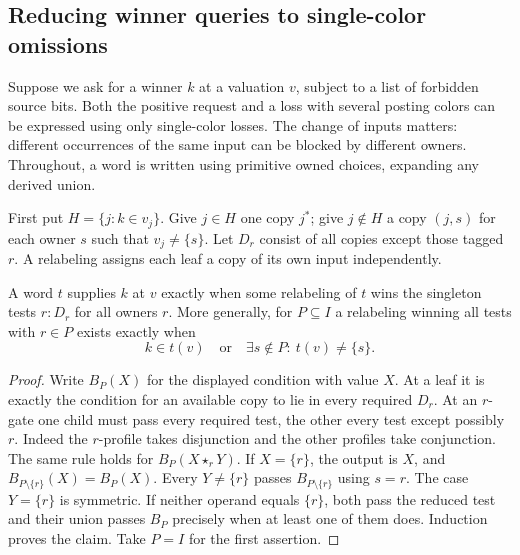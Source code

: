 \subsection{Reducing winner queries to single-color omissions}
\label{app:core-pure-interpolation}

Suppose we ask for a winner $k$ at a valuation $v$, subject to a list
of forbidden source bits. Both the positive request and a loss with
several posting colors can be expressed using only single-color losses.
The change of inputs matters: different occurrences of the same input
can be blocked by different owners. Throughout, a word is written using
primitive owned choices, expanding any derived union.

First put $H=\{j:k\in v_j\}$. Give $j\in H$ one copy $j^*$;
give $j\notin H$ a copy $(j,s)$ for each owner $s$ such that
$v_j\ne\{s\}$. Let $D_r$ consist of all copies except those tagged
$r$. A relabeling assigns each leaf a copy of its own input independently.

\begin{lemma}
\label{core:lem:winner-on-copies}
A word $t$ supplies $k$ at $v$ exactly when some relabeling of $t$
wins the singleton tests $r:D_r$ for all owners $r$.
More generally, for $P\subseteq I$ a relabeling winning all tests
with $r\in P$ exists exactly when
\[
 k\in t(v)\quad\text{or}\quad
 \exists s\notin P:\ t(v)\ne\{s\}.
\]
\end{lemma}
\begin{proof}
Write $B_P(X)$ for the displayed condition with value $X$. At a leaf it
is exactly the condition for an available copy to lie in every required
$D_r$. At an $r$-gate one child must pass every required test, the other
every test except possibly $r$. Indeed the $r$-profile takes disjunction
and the other profiles take conjunction. The same rule holds for
$B_P(X\star_r Y)$. If $X=\{r\}$, the output is $X$, and
$B_{P\setminus\{r\}}(X)=B_P(X)$. Every $Y\ne\{r\}$ passes
$B_{P\setminus\{r\}}$ using $s=r$. The case $Y=\{r\}$ is symmetric.
If neither operand equals $\{r\}$, both pass the reduced test and
their union passes $B_P$ precisely when at least one of them does.
Induction proves the claim. Take $P=I$ for the first assertion.
\end{proof}

